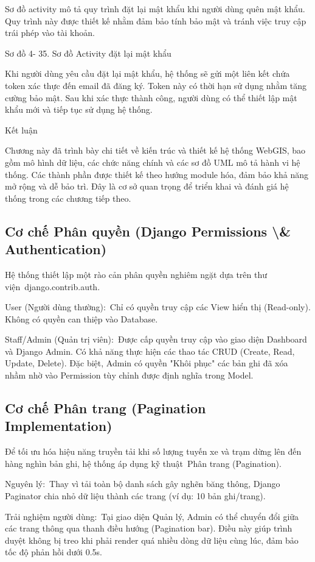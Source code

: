 \documentclass[13pt,a4paper]{report}
\begin{document}
Sơ đồ activity mô tả quy trình đặt lại mật khẩu khi người dùng quên mật khẩu. Quy trình này được thiết kế nhằm đảm bảo tính bảo mật và tránh việc truy cập trái phép vào tài khoản.

Sơ đồ 4- 35. Sơ đồ Activity đặt lại mật khẩu

Khi người dùng yêu cầu đặt lại mật khẩu, hệ thống sẽ gửi một liên kết chứa token xác thực đến email đã đăng ký. Token này có thời hạn sử dụng nhằm tăng cường bảo mật. Sau khi xác thực thành công, người dùng có thể thiết lập mật khẩu mới và tiếp tục sử dụng hệ thống.

Kết luận

Chương này đã trình bày chi tiết về kiến trúc và thiết kế hệ thống WebGIS, bao gồm mô hình dữ liệu, các chức năng chính và các sơ đồ UML mô tả hành vi hệ thống. Các thành phần được thiết kế theo hướng module hóa, đảm bảo khả năng mở rộng và dễ bảo trì. Đây là cơ sở quan trọng để triển khai và đánh giá hệ thống trong các chương tiếp theo.

\subsection{Cơ chế Phân quyền (Django Permissions \textbackslash{}& Authentication)}

Hệ thống thiết lập một rào cản phân quyền nghiêm ngặt dựa trên thư viện django.contrib.auth.

User (Người dùng thường): Chỉ có quyền truy cập các View hiển thị (Read-only). Không có quyền can thiệp vào Database.

Staff/Admin (Quản trị viên): Được cấp quyền truy cập vào giao diện Dashboard và Django Admin. Có khả năng thực hiện các thao tác CRUD (Create, Read, Update, Delete). Đặc biệt, Admin có quyền "Khôi phục" các bản ghi đã xóa nhầm nhờ vào Permission tùy chỉnh được định nghĩa trong Model.

\subsection{Cơ chế Phân trang (Pagination Implementation)}

Để tối ưu hóa hiệu năng truyền tải khi số lượng tuyến xe và trạm dừng lên đến hàng nghìn bản ghi, hệ thống áp dụng kỹ thuật Phân trang (Pagination).

Nguyên lý: Thay vì tải toàn bộ danh sách gây nghẽn băng thông, Django Paginator chia nhỏ dữ liệu thành các trang (ví dụ: 10 bản ghi/trang).

Trải nghiệm người dùng: Tại giao diện Quản lý, Admin có thể chuyển đổi giữa các trang thông qua thanh điều hướng (Pagination bar). Điều này giúp trình duyệt không bị treo khi phải render quá nhiều dòng dữ liệu cùng lúc, đảm bảo tốc độ phản hồi dưới 0.5s.
\end{document}
